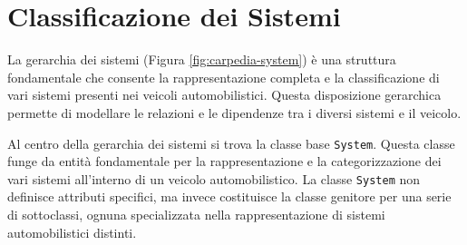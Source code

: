 \section{Classificazione dei Sistemi}

La gerarchia dei sistemi (Figura \ref{fig:carpedia-system}) è una struttura fondamentale che consente la rappresentazione completa e la classificazione di vari sistemi presenti nei veicoli automobilistici. Questa disposizione gerarchica permette di modellare le relazioni e le dipendenze tra i diversi sistemi e il veicolo.

Al centro della gerarchia dei sistemi si trova la classe base \texttt{System}. Questa classe funge da entità fondamentale per la rappresentazione e la categorizzazione dei vari sistemi all'interno di un veicolo automobilistico. La classe \texttt{System} non definisce attributi specifici, ma invece costituisce la classe genitore per una serie di sottoclassi, ognuna specializzata nella rappresentazione di sistemi automobilistici distinti.

